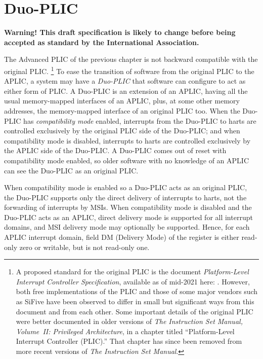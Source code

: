 
\chapter{Duo-PLIC}
\label{ch:DuoPLIC}

\textbf{%
Warning!
This draft specification is likely to change before being accepted as
standard by the {\RISCV} International Association.%
}
\bigskip

The Advanced PLIC of the previous chapter is not backward compatible
with the original {\RISCV} PLIC.%
\footnote{%
A proposed standard for the original PLIC is the document
\textit{{\RISCV} Platform-Level Interrupt Controller Specification},
available as of mid-2021 here:
.
However, both free implementations of the PLIC and those of some major
{\RISCV} vendors such as SiFive have been observed to differ in small
but significant ways from this document and from each other.
Some important details of the original PLIC were better documented in
older versions of
\textit{The {\RISCV} Instruction Set Manual, Volume~II: Privileged
Architecture}, in a chapter titled
``Platform-Level Interrupt Controller (PLIC).''
That chapter has since been removed from more recent versions of
\textit{The {\RISCV} Instruction Set Manual}.%
}
To ease the transition of software from the original PLIC to the
APLIC, a {\RISCV} system may have a \emph{\mbox{Duo-PLIC\/}}
that software can configure to act as either form of PLIC.
A \mbox{Duo-PLIC} is an extension of an APLIC, having all the
usual memory-mapped interfaces of an APLIC, plus, at some other
memory addresses, the memory-mapped interface of an original {\RISCV}
PLIC too.
When the \mbox{Duo-PLIC} has \emph{compatibility mode} enabled,
interrupts from the \mbox{Duo-PLIC} to harts are controlled exclusively
by the original PLIC side of the \mbox{Duo-PLIC};
and when compatibility mode is disabled, interrupts to harts
are controlled exclusively by the APLIC side of the
\mbox{Duo-PLIC}.
A \mbox{Duo-PLIC} comes out of reset with compatibility mode enabled,
so older software with no knowledge of an APLIC can see the
\mbox{Duo-PLIC} as an original PLIC.

When compatibility mode is enabled so a \mbox{Duo-PLIC} acts as an
original PLIC, the \mbox{Duo-PLIC} supports only the direct delivery of
interrupts to harts, not the forwarding of interrupts by MSIs.
When compatibility mode is disabled and the \mbox{Duo-PLIC} acts as
an APLIC, direct delivery mode is supported for all interrupt
domains, and MSI delivery mode may optionally be supported.
Hence, for each APLIC interrupt domain, field DM
(Delivery Mode) of the  register is either read-only zero
or writable, but is not read-only one.

